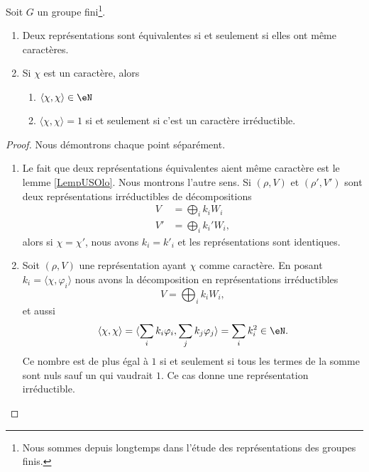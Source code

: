 \begin{theorem} \label{ThoWGkfADd}
    Soit \( G\) un groupe fini\footnote{Nous sommes depuis longtemps dans l'étude des représentations des groupes finis.}.
    \begin{enumerate}
        \item   \label{ItemZReOWoHi}
            Deux représentations sont équivalentes si et seulement si elles ont même caractères.
        \item   \label{ItemZReOWoHii}
            Si \( \chi\) est un caractère, alors 
            \begin{enumerate}
                \item
                    \( \langle \chi, \chi\rangle \in \eN\) 
                \item
                    \( \langle \chi, \chi\rangle =1\) si et seulement si c'est un caractère irréductible.   
            \end{enumerate}
    \end{enumerate}
\end{theorem}

\begin{proof}
    Nous démontrons chaque point séparément.
    \begin{enumerate}
        \item
            
    Le fait que deux représentations équivalentes aient même caractère est le lemme \ref{LempUSOlo}. Nous montrons l'autre sens. Si \( (\rho,V)\) et \( (\rho',V')\) sont deux représentations irréductibles de décompositions
    \begin{subequations}
        \begin{align}
            V&=\bigoplus_ik_iW_i\\
            V'&=\bigoplus_ik_i'W_i,
        \end{align}
    \end{subequations}
    alors si \( \chi=\chi'\), nous avons \( k_i=k'_i\) et les représentations sont identiques.

\item

    Soit \( (\rho,V)\) une représentation ayant \( \chi\) comme caractère. En posant \( k_i=\langle \chi, \varphi_i\rangle \) nous avons la décomposition en représentations irréductibles
    \begin{equation}
        V=\bigoplus_ik_iW_i,
    \end{equation}
    et aussi
    \begin{equation}
        \langle \chi, \chi\rangle =\langle \sum_ik_i\varphi_i, \sum_jk_j\varphi_j\rangle =\sum_ik_i^2\in \eN.
    \end{equation}
    Ce nombre est de plus égal à \( 1\) si et seulement si tous les termes de la somme sont nuls sauf un qui vaudrait \( 1\). Ce cas donne une représentation irréductible.

    \end{enumerate}
    
\end{proof}

